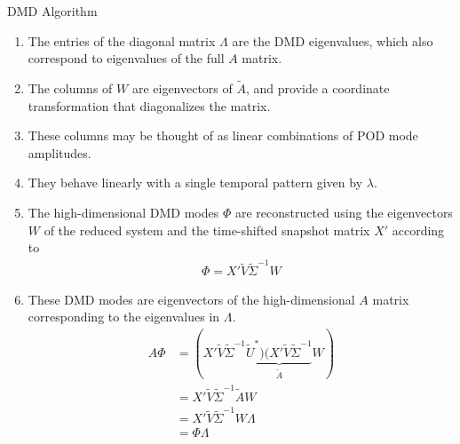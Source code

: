 \documentclass[hyperref={pdfpagemode=FullScreen},aspectratio=169]{beamer}
\begin{document}
\begin{frame}[allowframebreaks]{DMD Algorithm}
\begin{enumerate}
\begin{align}
\tilde{A} = W\Lambda W^{-1}
\end{align}
\item[] The entries of the diagonal matrix $\Lambda$ are the DMD eigenvalues, which also correspond to eigenvalues of the full $A$ matrix.
\item[] The columns of $W$ are eigenvectors of $\tilde{A}$, and provide a coordinate transformation that diagonalizes the matrix.
\item[] These columns may be thought of as linear combinations of POD mode amplitudes.
\item[] They behave linearly with a single temporal pattern given by $\lambda$.
\item The high-dimensional DMD modes $\Phi$ are reconstructed using the eigenvectors $W$ of the reduced system and the time-shifted snapshot matrix $X'$ according to
\begin{align} \label{eq23}
\Phi = X'\tilde{V}\tilde{\Sigma}^{-1}W
\end{align}
\item[] These DMD modes are eigenvectors of the high-dimensional $A$ matrix corresponding to the eigenvalues in $\Lambda$.
\begin{align}
A\Phi &= (X'\tilde{V}\tilde{\Sigma}^{-1}\underbrace{\tilde{U}^*)(X'\tilde{V}\tilde{\Sigma}^{-1}}_{\tilde{A}}W)\nonumber \\
&=X'\tilde{V}\tilde{\Sigma}^{-1}\tilde{A}W \nonumber \\
&= X'\tilde{V}\tilde{\Sigma}^{-1}W\Lambda \nonumber\\
&= \Phi \Lambda
\end{align}
\end{enumerate}
\end{frame}
\end{document}
